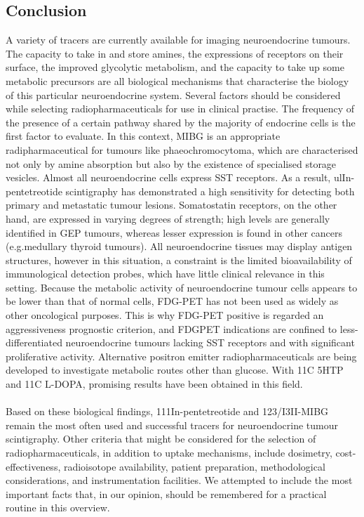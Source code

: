 \documentclass{article}
\begin{document}
\begin{multicols}{2}
\section{Conclusion}
A variety of tracers are currently available for imaging neuroendocrine tumours. The capacity to take in and store amines, the expressions of receptors on their surface, the improved glycolytic metabolism, and the capacity to take up some metabolic precursors are all biological mechanisms that characterise the biology of this particular neuroendocrine system. Several factors should be considered while selecting radiopharmaceuticals for use in clinical practise. The frequency of the presence of a certain pathway shared by the majority of endocrine cells is the first factor to evaluate. In this context, MIBG is an appropriate radipharmaceutical for tumours like phaeochromocytoma, which are characterised not only by amine absorption but also by the existence of specialised storage vesicles. Almost all neuroendocrine cells express SST receptors. As a result, ulIn-pentetreotide scintigraphy has demonstrated a high sensitivity for detecting both primary and metastatic tumour lesions. Somatostatin receptors, on the other hand, are expressed in varying degrees of strength; high levels are generally identified in GEP tumours, whereas lesser expression is found in other cancers (e.g.medullary thyroid tumours). All neuroendocrine tissues may display antigen structures, however in this situation, a constraint is the limited bioavailability of immunological detection probes, which have little clinical relevance in this setting. Because the metabolic activity of neuroendocrine tumour cells appears to be lower than that of normal cells, FDG-PET has not been used as widely as other oncological purposes. This is why FDG-PET positive is regarded an aggressiveness prognostic criterion, and FDGPET indications are confined to less-differentiated neuroendocrine tumours lacking SST receptors and with significant proliferative activity. Alternative positron emitter radiopharmaceuticals are being developed to investigate metabolic routes other than glucose. With 11C 5HTP and 11C L-DOPA, promising results have been obtained in this field. \\ \\
Based on these biological findings, 111In-pentetreotide and 123/I3II-MIBG remain the most often used and successful tracers for neuroendocrine tumour scintigraphy. Other criteria that might be considered for the selection of radiopharmaceuticals, in addition to uptake mechanisms, include dosimetry, cost-effectiveness, radioisotope availability, patient preparation, methodological considerations, and instrumentation facilities. We attempted to include the most important facts that, in our opinion, should be remembered for a practical routine in this overview.
\end{multicols}

\printbibliography
\end{document}
